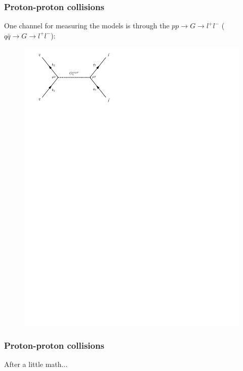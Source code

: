 \documentclass[10pt]{beamer}
\begin{document}
	\begin{frame}
		\frametitle{Proton-proton collisions}
		One channel for measuring the models is through the $pp\rightarrow G\rightarrow l^+l^-$ ($q\bar{q}\rightarrow G\rightarrow l^+l^-$):
		
		\begin{figure}[H]
			\centering
			\includegraphics[trim={0.5cm 22cm 11.5cm 0cm},scale=0.5]{../feynGraphs/qqbar_G_ffbar}
		\end{figure}
		
	\end{frame}
	
	\begin{frame}
		\frametitle{Proton-proton collisions}
		After a little math...
	\end{frame}
	
\end{document}
